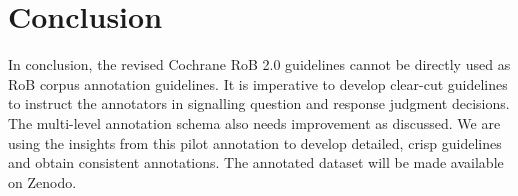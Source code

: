 \documentclass{IOS-Book-Article}
\begin{document}
\section{Conclusion}
\label{sec:conclusion}
%
In conclusion, the revised Cochrane RoB 2.0 guidelines cannot be directly used as RoB corpus annotation guidelines.
It is imperative to develop clear-cut guidelines to instruct the annotators in signalling question and response judgment decisions.
The multi-level annotation schema also needs improvement as discussed.
We are using the insights from this pilot annotation to develop detailed, crisp guidelines and obtain consistent annotations. 
The annotated dataset will be made available on Zenodo.
%
%
%
 
%
%

%
\end{document}
